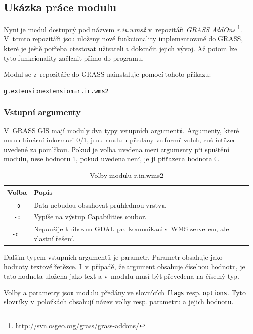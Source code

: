 \documentclass[a4paper,12pt]{article}
\begin{document}
\subsection{Ukázka práce modulu}

Nyní je modul dostupný pod názvem \emph{r.in.wms2} v~repozitáři \emph{GRASS
AddOns} \footnote{\url{http://svn.osgeo.org/grass/grass-addons/}}.
V~tomto repozitáři jsou uloženy nové funkcionality implementované do
GRASS, které je ještě potřeba otestovat uživateli a dokončit jejich
vývoj. Až potom lze tyto funkcionality začlenit přímo do
programu.


Modul se z~repozitáře do GRASS nainstaluje pomocí tohoto příkazu:
\begin{alltt}\footnotesize
g.extension extension=r.in.wms2
\end{alltt}

\subsubsection{Vstupní argumenty}

V~GRASS GIS mají moduly dva typy vstupních argumentů. Argumenty, které
nesou binární informaci 0/1, jsou modulu předány ve formě voleb,
což řetězce uvedené za pomlčkou. Pokud je volba uvedena mezi
argumenty při spuštění modulu, nese hodnotu 1, pokud uvedena není,
je ji přiřazena hodnota 0.

\begin{table}[h]
\centering
\begin{tabular}{|c|l|}      \hline
  Volba      &    Popis				\\ \hline
   {\tt -o}        &  Data nebudou obsahovat průhlednou  vrstvu.\\ \hline
   {\tt -c}       &  Vypíše na výstup Capabilities soubor.\\ \hline
   {\tt -d }      &  Nepoužije knihovnu GDAL pro komunikaci s~WMS serverem, ale vlastní řešení. \\ \hline
\end{tabular}
\caption{Volby modulu r.in.wms2}
\label{tab:flagy}
\end{table}

Dalším typem vstupních argumentů je parametr. Parametr obsahuje jako
hodnoty textové řetězce. I~v~případě, že argument obsahuje číselnou
hodnotu, je tato hodnota uložena jako text a v~modulu musí být
převedena na číselný typ.

Volby a parametry jsou modulu předány ve slovnících {\tt flags} resp. {\tt options}. 
Tyto slovníky v~položkách obsahují název volby resp. parametru a jejich
hodnotu.
\end{document}
